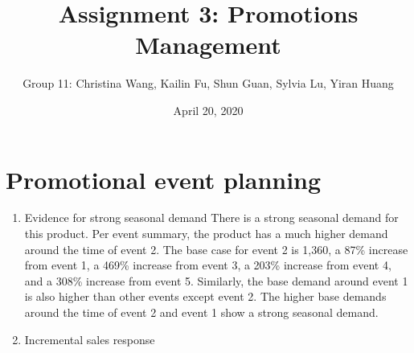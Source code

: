 \documentclass[]{article}
\title{Assignment 3: Promotions Management}
\author{Group 11: Christina Wang, Kailin Fu, Shun Guan, Sylvia Lu, Yiran Huang}
\date{April 20, 2020}
\newenvironment{Shaded}{\begin{snugshade}}{\end{snugshade}}
\newcommand{\DataTypeTok}[1]{\textcolor[rgb]{0.13,0.29,0.53}{#1}}
\newcommand{\DecValTok}[1]{\textcolor[rgb]{0.00,0.00,0.81}{#1}}
\newcommand{\FloatTok}[1]{\textcolor[rgb]{0.00,0.00,0.81}{#1}}
\newcommand{\KeywordTok}[1]{\textcolor[rgb]{0.13,0.29,0.53}{\textbf{#1}}}
\newcommand{\NormalTok}[1]{#1}
\newcommand{\OperatorTok}[1]{\textcolor[rgb]{0.81,0.36,0.00}{\textbf{#1}}}
\newcommand{\StringTok}[1]{\textcolor[rgb]{0.31,0.60,0.02}{#1}}
\begin{document}
\maketitle

{
\hypersetup{linkcolor=}
\setcounter{tocdepth}{2}
\tableofcontents
}
\setlength{\parskip}{6pt}
\newpage

\hypertarget{promotional-event-planning}{%
\section{Promotional event planning}\label{promotional-event-planning}}

\begin{enumerate}
\def\labelenumi{\arabic{enumi}.}
\item
  Evidence for strong seasonal demand There is a strong seasonal demand
  for this product. Per event summary, the product has a much higher
  demand around the time of event 2. The base case for event 2 is 1,360,
  a 87\% increase from event 1, a 469\% increase from event 3, a 203\%
  increase from event 4, and a 308\% increase from event 5. Similarly,
  the base demand around event 1 is also higher than other events except
  event 2. The higher base demands around the time of event 2 and event
  1 show a strong seasonal demand.
\item
  Incremental sales response
\end{enumerate}

\begin{Shaded}
\end{Shaded}
\end{document}
